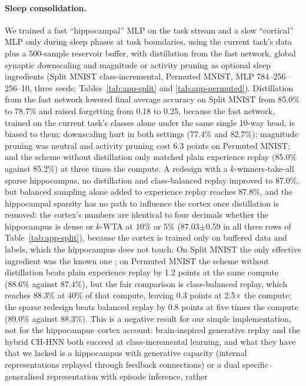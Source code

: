 \documentclass[11pt]{article}
\begin{document}
\paragraph{Sleep consolidation.} We trained a fast ``hippocampal'' MLP on the task stream and a slow ``cortical'' MLP only
during sleep phases at task boundaries, using the current task's data plus a 500-sample reservoir buffer, with distillation
from the fast network, global synaptic downscaling and magnitude or activity pruning as optional sleep ingredients
(Split MNIST class-incremental, Permuted MNIST, MLP 784--256--256--10, three seeds; Tables~\ref{tab:app-split} and
\ref{tab:app-permuted}). Distillation from the fast network lowered final average accuracy on Split MNIST from 85.0\% to
78.7\% and raised forgetting from 0.18 to 0.25, because the fast network, trained on the current task's classes alone under
the same single 10-way head, is biased to them; downscaling hurt in both settings (77.4\% and 82.7\%); magnitude pruning was neutral and
activity pruning cost 6.3 points on Permuted MNIST; and the scheme without distillation only matched plain experience replay
(85.0\% against 85.2\%) at three times the compute. A redesign with a $k$-winners-take-all sparse hippocampus, no distillation and
class-balanced replay improved to 87.0\%, but balanced sampling alone added to experience replay reaches 87.8\%, and the
hippocampal sparsity has no path to influence the cortex once distillation is removed: the cortex's numbers are identical
to four decimals whether the hippocampus is dense or $k$-WTA at 10\% or 5\% (87.03$\pm$0.59 in all three rows of
Table~\ref{tab:app-split}), because the cortex is trained only on buffered data and labels, which the hippocampus does not
touch. On Split MNIST the only effective
ingredient was the known one \citep{chrysakis2020}; on Permuted MNIST the scheme without distillation beats plain experience
replay by 1.2 points at the same compute (88.6\% against 87.4\%), but the fair comparison is class-balanced replay, which
reaches 88.3\% at 40\% of that compute, leaving 0.3 points at 2.5$\times$ the compute; the sparse redesign beats balanced
replay by 0.8 points at five times the compute (89.0\% against 88.3\%). This is a negative result for our simple implementation, not for the hippocampus--cortex
account: brain-inspired generative replay \citep{vandeven2020} and the hybrid CH-HNN \citep{shi2025} both succeed at
class-incremental learning, and what they have that we lacked is a hippocampus with generative capacity (internal
representations replayed through feedback connections) or a dual specific--generalised representation with episode inference, rather
\end{document}
